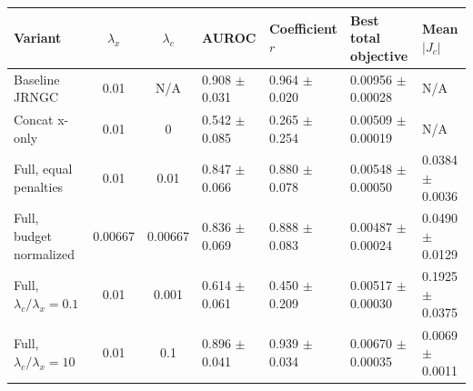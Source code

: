 \begin{tabularx}{\textwidth}{p{}ccYYYY}
\toprule
Variant & $\lambda_x$ & $\lambda_c$ & AUROC & Coefficient $r$ & Best total objective & Mean $|J_c|$ \\
\midrule
Baseline JRNGC & 0.01 & N/A & 0.908 $\pm$ 0.031 & 0.964 $\pm$ 0.020 & 0.00956 $\pm$ 0.00028 & N/A \\
Concat x-only & 0.01 & 0 & 0.542 $\pm$ 0.085 & 0.265 $\pm$ 0.254 & 0.00509 $\pm$ 0.00019 & N/A \\
Full, equal penalties & 0.01 & 0.01 & 0.847 $\pm$ 0.066 & 0.880 $\pm$ 0.078 & 0.00548 $\pm$ 0.00050 & 0.0384 $\pm$ 0.0036 \\
Full, budget normalized & 0.00667 & 0.00667 & 0.836 $\pm$ 0.069 & 0.888 $\pm$ 0.083 & 0.00487 $\pm$ 0.00024 & 0.0490 $\pm$ 0.0129 \\
Full, $\lambda_c/\lambda_x=0.1$ & 0.01 & 0.001 & 0.614 $\pm$ 0.061 & 0.450 $\pm$ 0.209 & 0.00517 $\pm$ 0.00030 & 0.1925 $\pm$ 0.0375 \\
Full, $\lambda_c/\lambda_x=10$ & 0.01 & 0.1 & 0.896 $\pm$ 0.041 & 0.939 $\pm$ 0.034 & 0.00670 $\pm$ 0.00035 & 0.0069 $\pm$ 0.0011 \\
\bottomrule
\end{tabularx}
